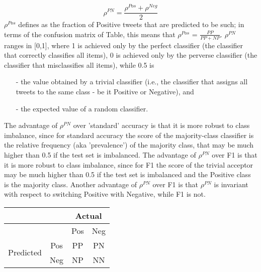 \documentclass[12pt]{article}
\begin{document}
\begin{equation} \label{eu_eqn}
\rho ^{PN} = \frac{\rho ^{Pos}+\rho ^{Neg}  }{2}
\end{equation}
$\rho ^{Pos}$ defines as the fraction of Positive tweets that are predicted to be such; in terms of the confusion matrix of Table, this means that $\rho ^{Pos}$ = $\frac{PP}{PP+ NP}$. $\rho ^{PN}$ ranges in [0,1], where 1 is achieved only by the perfect classifier (the classifier that correctly classifies all items), 0 is achieved only by the perverse classifier (the classifier that misclassifies all items), while 0.5 is
\begin{itemize}
\item[-] the value obtained by a trivial classifier (i.e., the classifier that assigns all tweets to the same class - be it Positive or Negative), and
\item[-] the expected value of a random classifier.
\end{itemize}

The advantage of $\rho ^{PN}$ over 'standard' accuracy is that it is more robust to class imbalance, since for standard accuracy the score of the majority-class classifier is the relative frequency (aka 'prevalence') of the majority class, that may be much higher than 0.5 if the test set is imbalanced.
The advantage of $\rho ^{PN}$ over F1 is that it is more robust to class imbalance, since for F1 the score of the trivial acceptor may be much higher than 0.5 if the test set is imbalanced and the Positive class is the majority class. Another advantage of $\rho ^{PN}$ over F1 is that $\rho ^{PN}$ is invariant with respect to switching Positive with Negative, while F1 is not.

\begin{center}
\begin{tabular}{|c |c|c|c| } 
 \hline

\multicolumn{2}{|c|}{ \multirow{2}{*}{}} & \multicolumn{2}{|c|}{Actual} \\ \hline
 \multicolumn{2}{|c|}{} & Pos & Neg \\ \hline
\multirow{2}{*}{Predicted} & Pos & PP & PN \\ 
& Neg & NP & NN \\ \hline
\end{tabular}
\end{center}

\vspace{-5mm}
\end{document}
